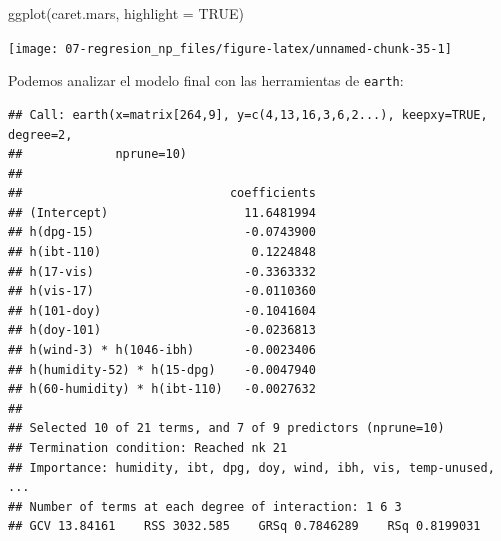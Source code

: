 \documentclass[
]{book}
\newenvironment{Shaded}{\begin{snugshade}}{\end{snugshade}}
\newcommand{\AttributeTok}[1]{\textcolor[rgb]{0.77,0.63,0.00}{#1}}
\newcommand{\CommentTok}[1]{\textcolor[rgb]{0.56,0.35,0.01}{\textit{#1}}}
\newcommand{\ConstantTok}[1]{\textcolor[rgb]{0.00,0.00,0.00}{#1}}
\newcommand{\DecValTok}[1]{\textcolor[rgb]{0.00,0.00,0.81}{#1}}
\newcommand{\FunctionTok}[1]{\textcolor[rgb]{0.00,0.00,0.00}{#1}}
\newcommand{\NormalTok}[1]{#1}
\newcommand{\SpecialCharTok}[1]{\textcolor[rgb]{0.00,0.00,0.00}{#1}}
\newcommand{\StringTok}[1]{\textcolor[rgb]{0.31,0.60,0.02}{#1}}
\theoremstyle{break}
\theoremstyle{definition}
\theoremstyle{definition}
\theoremstyle{definition}
\theoremstyle{definition}
\theoremstyle{remark}
\begin{document}
\begin{Shaded}
\begin{Highlighting}[]
\FunctionTok{ggplot}\NormalTok{(caret.mars, }\AttributeTok{highlight =} \ConstantTok{TRUE}\NormalTok{)}
\end{Highlighting}
\end{Shaded}

\begin{center}\texttt{[image: 07-regresion\_np\_files/figure-latex/unnamed-chunk-35-1]} \end{center}

Podemos analizar el modelo final con las herramientas de \texttt{earth}:

\begin{Shaded}
\end{Shaded}

\begin{verbatim}
## Call: earth(x=matrix[264,9], y=c(4,13,16,3,6,2...), keepxy=TRUE, degree=2,
##             nprune=10)
## 
##                             coefficients
## (Intercept)                   11.6481994
## h(dpg-15)                     -0.0743900
## h(ibt-110)                     0.1224848
## h(17-vis)                     -0.3363332
## h(vis-17)                     -0.0110360
## h(101-doy)                    -0.1041604
## h(doy-101)                    -0.0236813
## h(wind-3) * h(1046-ibh)       -0.0023406
## h(humidity-52) * h(15-dpg)    -0.0047940
## h(60-humidity) * h(ibt-110)   -0.0027632
## 
## Selected 10 of 21 terms, and 7 of 9 predictors (nprune=10)
## Termination condition: Reached nk 21
## Importance: humidity, ibt, dpg, doy, wind, ibh, vis, temp-unused, ...
## Number of terms at each degree of interaction: 1 6 3
## GCV 13.84161    RSS 3032.585    GRSq 0.7846289    RSq 0.8199031
\end{verbatim}

\begin{Shaded}
\end{Shaded}
\end{document}
